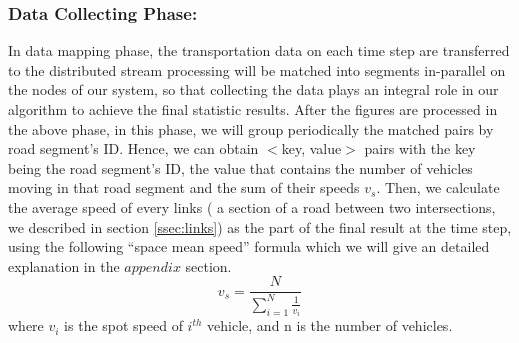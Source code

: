 \documentclass{acm_proc_article-sp}
\begin{document}
\subsubsection{Data Collecting Phase:} \label{datacollectingphase} In data mapping phase, the transportation data on each time step are transferred to the distributed stream processing will be matched into segments in-parallel on the nodes of our system, so that collecting the data plays an integral role in our algorithm to achieve the final statistic results.  After the figures are processed in the above phase, in this phase, we will group periodically the matched pairs by road segment's ID. Hence, we can obtain $<$key, value$>$ pairs with the key being the road segment's ID, the value that contains the number of vehicles moving in that road segment and the sum of their speeds $v_{s}$. Then, we calculate the average speed of every links ( a section of a road between two intersections, we described in section \ref{ssec:links}) as the part of the final result at the time step, using the following ``space mean speed'' formula which we will give an detailed explanation in the $appendix$ section.
\[ v_{s} = \frac{N}{\sum_{i=1}^{N}\frac{1}{v_{i}}}\]
where $v_{i}$ is the spot speed of $i^{th}$ vehicle, and n is the number of vehicles.
\end{document}
